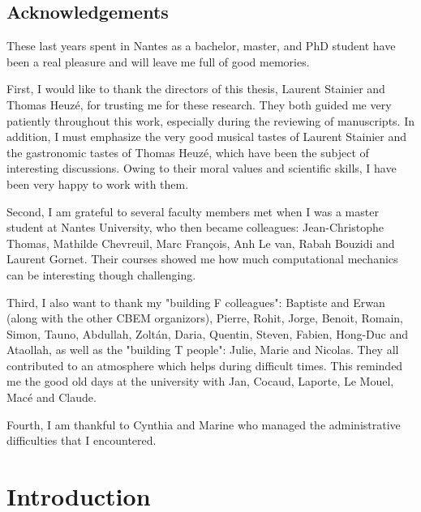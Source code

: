 \documentclass[10pt,a4paper,twoside]{report}
\begin{document}

\section*{Acknowledgements}
These last years spent in Nantes as a bachelor, master, and PhD student have been a real pleasure and will leave me full of good memories.

First, I would like to thank the directors of this thesis, Laurent Stainier and Thomas Heuz{\'e}, for trusting me for these research.
They both guided me very patiently throughout this work, especially during the reviewing of manuscripts.
In addition, I must emphasize the very good musical tastes of Laurent Stainier and the gastronomic tastes of Thomas Heuz{\'e}, which have been the subject of interesting discussions.
Owing to their moral values and scientific skills, I have been very happy to work with them.

Second, I am grateful to several faculty members met when I was a master student at Nantes University, who then became colleagues: Jean-Christophe Thomas, Mathilde Chevreuil, Marc Fran{\c c}ois, Anh Le van, Rabah Bouzidi and Laurent Gornet. 
Their courses showed me how much computational mechanics can be interesting though challenging.

Third, I also want to thank my "building F colleagues": Baptiste and Erwan (along with the other CBEM organizors), Pierre, Rohit, Jorge, Benoit, Romain, Simon, Tauno, Abdullah, Zolt{\'a}n, Daria, Quentin, Steven, Fabien, Hong-Duc and Ataollah, as well as the "building T people": Julie, Marie and Nicolas.
They all contributed to an atmosphere which helps during difficult times. 
This reminded me the good old days at the university with Jan, Cocaud, Laporte, Le Mouel, Mac{\'e} and Claude.

Fourth, I am thankful to Cynthia and Marine who managed the administrative difficulties that I encountered.
\tableofcontents{}


\chapter{Introduction}

\end{document}
